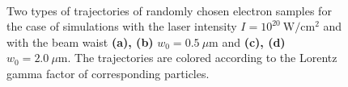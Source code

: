 \begin{figure}[h!]
	\centering
	\\[2mm]
	\caption{Two types of trajectories of randomly chosen electron samples for the case of simulations with the laser intensity $ I = 10^{20} \ \mathrm{W/cm^2} $ and with the beam waist \textbf{(a), (b)} $ w_0 = 0.5 \ \mu\mathrm{m} $ and \textbf{(c), (d)} $ w_0 = 2.0 \ \mu\mathrm{m} $. The trajectories are colored according to the Lorentz gamma factor of corresponding particles.}
	\label{fig:19}
\end{figure}

